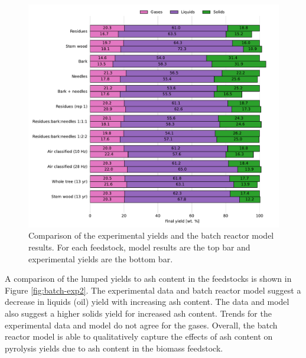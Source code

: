 \begin{figure}[H]
    \centering
    \includegraphics[width=\textwidth]{figures/batch-exp1.pdf}
    \caption{Comparison of the experimental yields and the batch reactor model results. For each feedstock, model results are the top bar and experimental yields are the bottom bar.}
    \label{fig:batch-exp1}
\end{figure}

A comparison of the lumped yields to ash content in the feedstocks is shown in Figure \ref{fig:batch-exp2}. The experimental data and batch reactor model suggest a decrease in liquids (oil) yield with increasing ash content. The data and model also suggest a higher solids yield for increased ash content. Trends for the experimental data and model do not agree for the gases. Overall, the batch reactor model is able to qualitatively capture the effects of ash content on pyrolysis yields due to ash content in the biomass feedstock.

